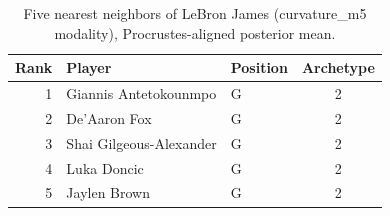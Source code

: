 \begin{table}[htbp]
  \centering\small
  \begin{tabular}{rllc}
    \toprule
    Rank & Player & Position & Archetype \\
    \midrule
    1 & Giannis Antetokounmpo & G & 2 \\
    2 & De'Aaron Fox & G & 2 \\
    3 & Shai Gilgeous-Alexander & G & 2 \\
    4 & Luka Doncic & G & 2 \\
    5 & Jaylen Brown & G & 2 \\
    \bottomrule
  \end{tabular}
  \caption{Five nearest neighbors of LeBron James (curvature_m5 modality), Procrustes-aligned posterior mean.}
  \label{tab:LeBron_James_neighbors_curvature_m5}
\end{table}

